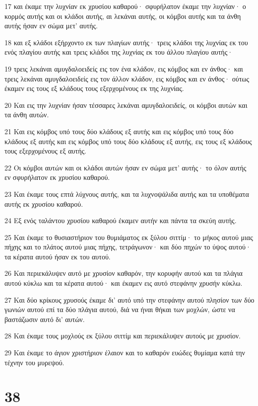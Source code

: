 \par 17 και έκαμε την λυχνίαν εκ χρυσίου καθαρού· σφυρήλατον έκαμε την λυχνίαν· ο κορμός αυτής και οι κλάδοι αυτής, αι λεκάναι αυτής, οι κόμβοι αυτής και τα άνθη αυτής ήσαν εν σώμα μετ' αυτής.
\par 18 και εξ κλάδοι εξήρχοντο εκ των πλαγίων αυτής· τρεις κλάδοι της λυχνίας εκ του ενός πλαγίου αυτής και τρεις κλάδοι της λυχνίας εκ του άλλου πλαγίου αυτής·
\par 19 τρεις λεκάναι αμυγδαλοειδείς εις τον ένα κλάδον, εις κόμβος και εν άνθος· και τρεις λεκάναι αμυγδαλοειδείς εις τον άλλον κλάδον, εις κόμβος και εν άνθος· ούτως έκαμεν εις τους εξ κλάδους τους εξερχομένους εκ της λυχνίας.
\par 20 Και εις την λυχνίαν ήσαν τέσσαρες λεκάναι αμυγδαλοειδείς, οι κόμβοι αυτών και τα άνθη αυτών.
\par 21 Και εις κόμβος υπό τους δύο κλάδους εξ αυτής και εις κόμβος υπό τους δύο κλάδους εξ αυτής και εις κόμβος υπό τους δύο κλάδους εξ αυτής, εις τους εξ κλάδους τους εξερχομένους εξ αυτής.
\par 22 Οι κόμβοι αυτών και οι κλάδοι αυτών ήσαν εν σώμα μετ' αυτής· το όλον αυτής εν σφυρήλατον εκ χρυσίου καθαρού.
\par 23 Και έκαμε τους επτά λύχνους αυτής, και τα λυχνοψάλιδα αυτής και τα υποθέματα αυτής εκ χρυσίου καθαρού.
\par 24 Εξ ενός ταλάντου χρυσίου καθαρού έκαμεν αυτήν και πάντα τα σκεύη αυτής.
\par 25 Και έκαμε το θυσιαστήριον του θυμιάματος εκ ξύλου σιττίμ· το μήκος αυτού μιας πήχης και το πλάτος αυτού μιας πήχης, τετράγωνον· και δύο πηχών το ύψος αυτού· τα κέρατα αυτού ήσαν εκ του αυτού.
\par 26 Και περιεκάλυψεν αυτό με χρυσίον καθαρόν, την κορυφήν αυτού και τα πλάγια αυτού κύκλω και τα κέρατα αυτού· και έκαμεν εις αυτό στεφάνην χρυσήν κύκλω.
\par 27 Και δύο κρίκους χρυσούς έκαμε δι' αυτό υπό την στεφάνην αυτού πλησίον των δύο γωνιών αυτού επί τα δύο πλάγια αυτού, διά να ήναι θήκαι των μοχλών, ώστε να βαστάζωσιν αυτό δι' αυτών.
\par 28 Και έκαμε τους μοχλούς εκ ξύλου σιττίμ και περιεκάλυψεν αυτούς με χρυσίον.
\par 29 Και έκαμε το άγιον χριστήριον έλαιον και το καθαρόν ευώδες θυμίαμα κατά την τέχνην του μυρεψού.

\chapter{38}

